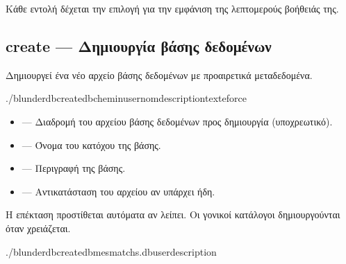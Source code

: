 \documentclass[letterpaper,10pt,greek]{sphinxmanual}
\begin{document}
\sphinxAtStartPar
Κάθε εντολή δέχεται την επιλογή  για την εμφάνιση της λεπτομερούς βοήθειάς της.


\subsection{create — Δημιουργία βάσης δεδομένων}
\label{\detokenize{cli:create-creer-une-base-de-donnees}}
\sphinxAtStartPar
Δημιουργεί ένα νέο αρχείο βάσης δεδομένων με προαιρετικά μεταδεδομένα.

\begin{sphinxVerbatim}[commandchars=\\\{\}]
./blunderdbcreate\PYGZhy{}\PYGZhy{}db\PYGZlt{}chemin\PYGZgt{}\PYG{o}{[}\PYGZhy{}\PYGZhy{}user\PYGZlt{}nom\PYGZgt{}\PYG{o}{]}\PYG{o}{[}\PYGZhy{}\PYGZhy{}description\PYGZlt{}texte\PYGZgt{}\PYG{o}{]}\PYG{o}{[}\PYGZhy{}\PYGZhy{}force\PYG{o}{]}
\end{sphinxVerbatim}

\sphinxAtStartPar
{}
\begin{itemize}
\item {} 
\sphinxAtStartPar
{} — Διαδρομή του αρχείου βάσης δεδομένων προς δημιουργία (υποχρεωτικό).

\item {} 
\sphinxAtStartPar
{} — Όνομα του κατόχου της βάσης.

\item {} 
\sphinxAtStartPar
{} — Περιγραφή της βάσης.

\item {} 
\sphinxAtStartPar
{} — Αντικατάσταση του αρχείου αν υπάρχει ήδη.

\end{itemize}

\sphinxAtStartPar
Η επέκταση  προστίθεται αυτόματα αν λείπει. Οι γονικοί κατάλογοι δημιουργούνται όταν χρειάζεται.

\sphinxAtStartPar
{}

\begin{sphinxVerbatim}[commandchars=\\\{\}]
./blunderdbcreate\PYGZhy{}\PYGZhy{}dbmes\PYGZus{}matchs.db\PYGZhy{}\PYGZhy{}user\PYGZhy{}\PYGZhy{}description
\end{sphinxVerbatim}
\end{document}
